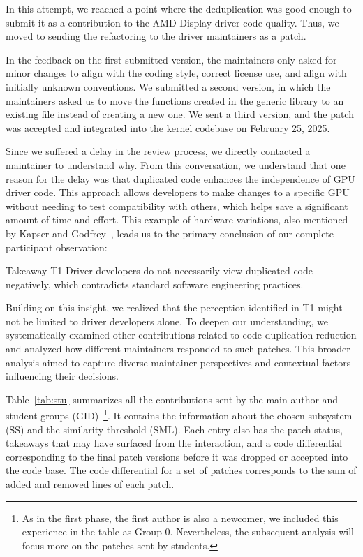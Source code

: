 \documentclass[10pt,conference]{IEEEtran}
\newenvironment{highlight-box}[1]{%
  \begin{tcolorbox}
  \textbf{#1:} \itshape}{\end{tcolorbox}}
\begin{document}
In this attempt, we reached a point where the deduplication was good enough to submit it as a contribution to the AMD Display driver code quality. Thus, we moved to sending the refactoring to the driver maintainers as a patch.

In the feedback on the first submitted version, the maintainers only asked for minor changes to align with the coding style, correct license use, and align with initially unknown conventions. We submitted a second version, in which the maintainers asked us to move the functions created in the generic library to an existing file instead of creating a new one. We sent a third version, and the patch was accepted and integrated into the kernel codebase on February 25, 2025.

Since we suffered a delay in the review process, we directly contacted a maintainer to understand why. From this conversation, we understand that one reason for the delay was that duplicated code enhances the independence of GPU driver code. This approach allows developers to make changes to a specific GPU without needing to test compatibility with others, which helps save a significant amount of time and effort. This example of hardware variations, also mentioned by Kapser and Godfrey~\cite{cloneharm}, leads us to the primary conclusion of our complete participant observation:

\begin{highlight-box}{Takeaway T1}
Driver developers do not necessarily view duplicated code negatively, which contradicts standard software engineering practices.
\end{highlight-box}

Building on this insight, we realized that the perception identified in T1 might not be limited to driver developers alone. To deepen our understanding, we systematically examined other contributions related to code duplication reduction and analyzed how different maintainers responded to such patches. This broader analysis aimed to capture diverse maintainer perspectives and contextual factors influencing their decisions.

Table~\ref{tab:stu} summarizes all the contributions sent by the main author and student groups (GID)~\footnote{As in the first phase, the first author is also a newcomer, we included this experience in the table as Group 0. Nevertheless, the subsequent analysis will focus more on the patches sent by students.}. It contains the information about the chosen subsystem (SS) and the similarity threshold (SML). Each entry also has the patch status, takeaways that may have surfaced from the interaction, and a code differential corresponding to the final patch versions before it was dropped or accepted into the code base. The code differential for a set of patches corresponds to the sum of added and removed lines of each patch.
\end{document}
